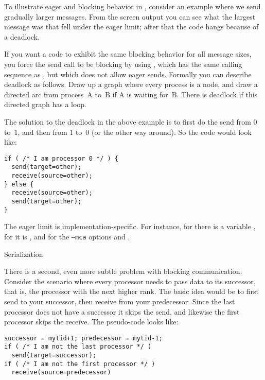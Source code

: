 To illustrate eager and blocking behavior in ,
consider an example where we send
gradually larger messages. From the screen output you can see what
the largest message was that fell under the eager limit; after that the code
hangs because of a deadlock.
%
%
%

If you want a code to exhibit the same blocking behavior for  all message sizes,
you force the send call to be blocking by using
, which has the same calling sequence as ,
but which does not allow eager sends.
%
%
Formally you can describe deadlock as follows. Draw up a graph where
every process is a node, and draw a directed arc from process~A to~B if
A is waiting for~B. There is deadlock if this directed graph has a
loop.

The solution to the deadlock in the above example is to first do the
send from 0 to~1, and then from 1 to~0 (or the other way around). So
the code would look like:
\begin{lstlisting}
if ( /* I am processor 0 */ ) {
  send(target=other);
  receive(source=other);
} else {
  receive(source=other);
  send(target=other);
}
\end{lstlisting}

The eager limit is implementation-specific. For instance, for
 there is a variable
, for  it is
, and for  the
\texttt{--mca} options  and
.


 {Serialization}
\label{sec:serialization}

There is a second, even more subtle problem with blocking
communication. Consider the scenario where every processor needs to
pass data to its successor, that is, the processor with the next
higher rank. The basic idea would be to first send to your successor,
then receive from your predecessor. Since the last processor does not
have a successor it skips the send, and likewise the first processor
skips the receive. The pseudo-code looks like:
\begin{lstlisting}
successor = mytid+1; predecessor = mytid-1;
if ( /* I am not the last processor */ )
  send(target=successor);
if ( /* I am not the first processor */ )
  receive(source=predecessor)
\end{lstlisting}

